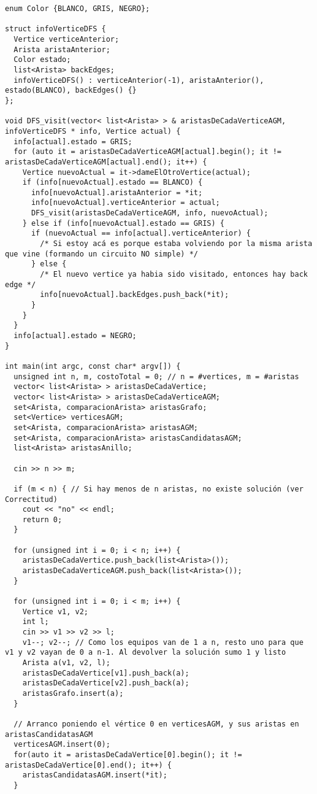 \begin{lstlisting}[frame=single]
enum Color {BLANCO, GRIS, NEGRO};

struct infoVerticeDFS {
  Vertice verticeAnterior;
  Arista aristaAnterior;
  Color estado;
  list<Arista> backEdges;
  infoVerticeDFS() : verticeAnterior(-1), aristaAnterior(), estado(BLANCO), backEdges() {}
};

void DFS_visit(vector< list<Arista> > & aristasDeCadaVerticeAGM, infoVerticeDFS * info, Vertice actual) {
  info[actual].estado = GRIS;
  for (auto it = aristasDeCadaVerticeAGM[actual].begin(); it != aristasDeCadaVerticeAGM[actual].end(); it++) {
    Vertice nuevoActual = it->dameElOtroVertice(actual);
    if (info[nuevoActual].estado == BLANCO) {
      info[nuevoActual].aristaAnterior = *it;
      info[nuevoActual].verticeAnterior = actual;
      DFS_visit(aristasDeCadaVerticeAGM, info, nuevoActual);
    } else if (info[nuevoActual].estado == GRIS) {
      if (nuevoActual == info[actual].verticeAnterior) {
        /* Si estoy acá es porque estaba volviendo por la misma arista que vine (formando un circuito NO simple) */
      } else {
        /* El nuevo vertice ya habia sido visitado, entonces hay back edge */
        info[nuevoActual].backEdges.push_back(*it);
      }
    }
  }
  info[actual].estado = NEGRO;
}

int main(int argc, const char* argv[]) {
  unsigned int n, m, costoTotal = 0; // n = #vertices, m = #aristas
  vector< list<Arista> > aristasDeCadaVertice;
  vector< list<Arista> > aristasDeCadaVerticeAGM;
  set<Arista, comparacionArista> aristasGrafo;
  set<Vertice> verticesAGM;
  set<Arista, comparacionArista> aristasAGM;
  set<Arista, comparacionArista> aristasCandidatasAGM;
  list<Arista> aristasAnillo;
  
  cin >> n >> m;
  
  if (m < n) { // Si hay menos de n aristas, no existe solución (ver Correctitud)
    cout << "no" << endl;
    return 0;
  }
  
  for (unsigned int i = 0; i < n; i++) {
    aristasDeCadaVertice.push_back(list<Arista>());
    aristasDeCadaVerticeAGM.push_back(list<Arista>());
  }
  
  for (unsigned int i = 0; i < m; i++) {
    Vertice v1, v2;
    int l;
    cin >> v1 >> v2 >> l;
    v1--; v2--; // Como los equipos van de 1 a n, resto uno para que v1 y v2 vayan de 0 a n-1. Al devolver la solución sumo 1 y listo
    Arista a(v1, v2, l);
    aristasDeCadaVertice[v1].push_back(a);
    aristasDeCadaVertice[v2].push_back(a);
    aristasGrafo.insert(a);
  }
  
  // Arranco poniendo el vértice 0 en verticesAGM, y sus aristas en aristasCandidatasAGM
  verticesAGM.insert(0);
  for(auto it = aristasDeCadaVertice[0].begin(); it != aristasDeCadaVertice[0].end(); it++) {
    aristasCandidatasAGM.insert(*it);
  }
  

\end{lstlisting}
